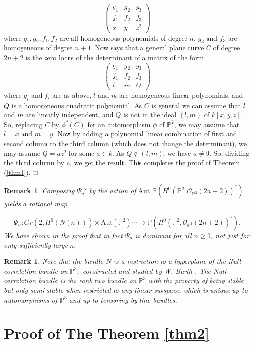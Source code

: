 \documentclass[11pt]{amsart}
\newtheorem{rem}[subsection]{Remark}
\theoremstyle{definition}
\newcommand{\OOO}{{\mathcal O}}
\renewcommand\square{\frame{\phantom{{\large x}}}}
\begin{document}
 \[ \begin{pmatrix}
g_1 & g_2 & g_3\\
f_1 & f_2 & f_3\\
x & y & z^2
\end{pmatrix}
\] where $g_1, g_2, f_1,f_2$ are all homogeneous polynomials  of degree $n$, $g_3$ and $f_3$ are homogeneous of degree $n+1$. Now {\cite[Main Theorem]{LuJu}}
 says that a general plane curve $C$ of degree $2n+2$ is the zero locus of the 
 determinant of a matrix of the form 
 \[ \begin{pmatrix}
g_1 & g_2 & g_3\\
f_1 & f_2 & f_3\\
l & m & Q
\end{pmatrix}
\]
where $g_i$ and $f_i$ are as above, $l$ and $m$ are homogeneous linear polynomials, 
and $Q$ is a homogeneous quadratic polynomial. As $C$ is general we can assume that 
$l$ and $m$ are linearly independent, and $Q$ is not in the ideal $(l,m)$ of 
$k[x,y,z]$. So, replacing $C$ by $\phi^*(C)$ for an automorphism $\phi$ of 
$\mathbb{P}^2$, we may assume that $l=x$ and $m=y.$ Now by adding a polynomial linear 
combination of first and second column to the third column (which does not change the
determinant), we may assume $Q=az^2$ for some $a\in k$. As $Q\not\in (l,m)$, we have
$a\neq 0$. So, dividing the third column by $a$, we get the result. This completes the 
proof of Theorem (\ref{thm1}).
$\hfill{\square}$
\begin{rem}
    Composing $\Psi_n'$ by the action of $\textrm{Aut }\mathbb{P}(H^0(\mathbb{P}^2, \OOO_{\mathbb{P}^2}(2n+2))^*)$ yields a rational map

\[
 \Psi_n : Gr(2, H^0(N(n)))\times \textrm{Aut}(\mathbb{P}^2)
  \cdots\to \mathbb{P}(H^0(\mathbb{P}^2, \OOO_{\mathbb{P}^2}(2n+2))^*).  
 \] We have shown in the proof that in fact $\Psi_n$ is dominant for all $n\geq 0$, not just for only sufficiently large $n.$ 
\end{rem} 
\begin{rem} Note that the bundle $N$ is a restriction to a hyperplane  of the Null correlation bundle on $\mathbb{P}^3,$ constructed and studied by W. Barth \cite{Ba}. The Null correlation bundle is the rank-two bundle on $\mathbb{P}^3$ with the property of being stable but only semi-stable when restricted to any linear subspace, which is unique up to automorphisms of $\mathbb{P}^3$ and up to tensoring by line bundles.
\end{rem}
 \section{Proof of The Theorem \ref{thm2}}
\end{document}
